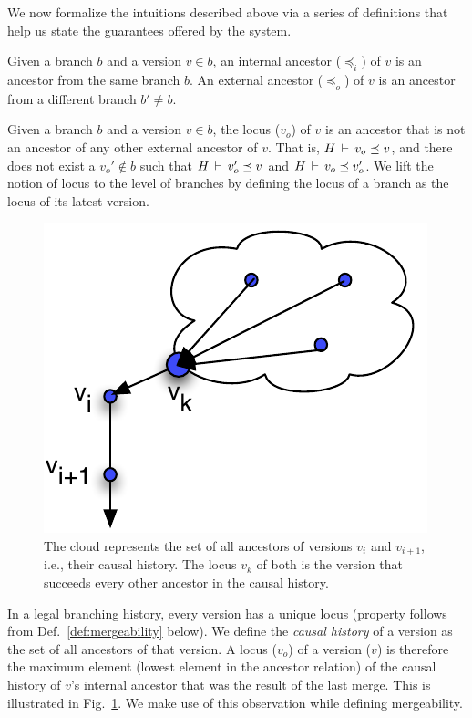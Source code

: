 We now formalize the intuitions described above via a series of
definitions that help us state the guarantees offered by the system.

\begin{definition} 
Given a branch $b$ and a version $v\in b$, an internal ancestor
($\preceq_i$) of $v$ is an ancestor from the same branch $b$. An
external ancestor ($\preceq_o$) of $v$ is an ancestor from a different
branch $b'\neq b$.
\end{definition}

\begin{definition} 
Given a branch $b$ and a version $v\in b$, the locus ($v_o$) of $v$ is an
ancestor that is not an ancestor of any other external ancestor of
$v$. That is, $H\,\vdash\,v_o \preceq v$, and there does not exist a
$v_o' \not\in b$ such that $H\,\vdash\,v_o' \preceq v$ and
$H\,\vdash\,v_o \preceq v_o'$. We lift the notion of locus to the
level of branches by defining the locus of a branch as the locus of
its latest version.
\end{definition}

\begin{figure}
\centering
\includegraphics[scale=0.6]{Figures/causal-history}
\caption{The cloud represents the set of all ancestors of versions $v_i$ and
$v_{i+1}$, i.e., their causal history. The locus $v_k$ of both is the
version that succeeds every other ancestor in the causal history.}
\label{fig:causal-history}
\end{figure}
In a legal branching history, every version has a unique locus
(property follows from Def.~\ref{def:mergeability} below). We define
the \emph{causal history} of a version as the set of all ancestors of
that version. A locus ($v_o$) of a version ($v$) is therefore the
maximum element (lowest element in the ancestor relation) of the
causal history of $v$'s internal ancestor that was the result of the
last merge. This is illustrated in Fig.~\ref{fig:causal-history}. We
make use of this observation while defining mergeability.

